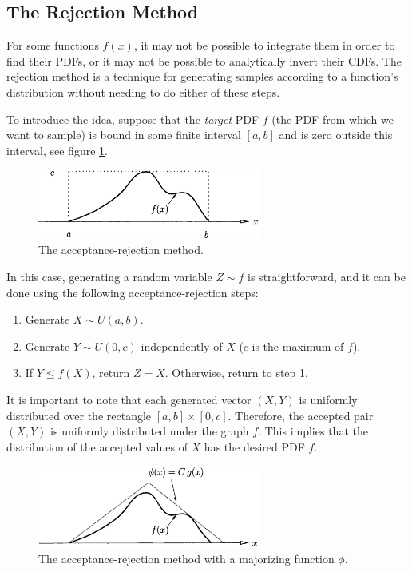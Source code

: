 \subsection{The Rejection Method}
For some functions $f(x)$, it may not be possible to integrate them in order to find their PDFs, or it may not be possible to analytically invert their CDFs. The rejection method is a technique for generating samples according to a function's distribution without needing to do either of these steps.

To introduce the idea, suppose that the \textit{target} PDF $f$ (the PDF from which we want to sample) is bound in some finite interval $[a,b]$ and is zero outside this interval, see figure \ref{f:rejection-idea}.

\begin{figure}
\sidecaption
	\includegraphics[width=0.65\textwidth]{graphics/gi/mc-6}
	\caption{The acceptance-rejection method.}
	\label{f:rejection-idea}
\end{figure}

In this case, generating a random variable $Z\sim f$ is straightforward, and it can be done using the following acceptance-rejection steps:

\begin{enumerate}
	\item Generate $X\sim U(a,b)$.
	\item Generate $Y\sim U(0,c)$ independently of $X$ ($c$ is the maximum of $f$). 
	\item If $Y\leq f(X)$, return $Z=X$. Otherwise, return to step 1.
\end{enumerate}

It is important to note that each generated vector $(X,Y)$ is uniformly distributed over the rectangle $[a,b]\times [0,c]$. Therefore, the accepted pair $(X,Y)$ is uniformly distributed under the graph $f$. This implies that the distribution of the accepted values of $X$ has the desired PDF $f$.

\begin{figure}
\sidecaption
	\includegraphics[width=0.65\textwidth]{graphics/gi/mc-7}
	\caption{The acceptance-rejection method with a majorizing function $\phi$.}
	\label{f:rejection-generalized}
\end{figure}

